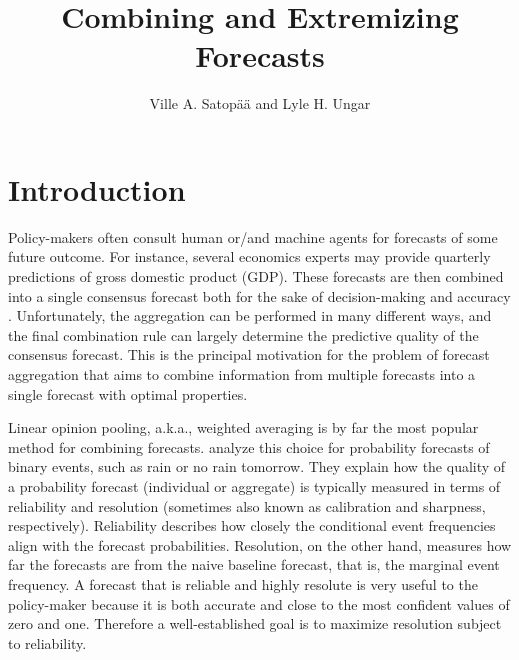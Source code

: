 \documentclass[11pt]{article}
\title{Combining and Extremizing Forecasts}
\author{
Ville A. Satop\"a\"a and Lyle H. Ungar}
\date{}
\theoremstyle{definition}
\theoremstyle{definition}
\begin{document}
\maketitle



\section{Introduction} \label{introduction}
Policy-makers often consult human or/and machine agents for forecasts of some future outcome. For instance, several economics experts may provide quarterly predictions of gross domestic product (GDP). These forecasts are then combined into a single consensus forecast both for the sake of decision-making and accuracy \citep{armstrong2}. Unfortunately, the aggregation can be performed  in many different ways, and the final combination rule can largely determine the predictive quality of the consensus forecast. This is the principal motivation for the problem of forecast aggregation that aims to combine information from multiple forecasts into a single forecast with optimal properties.

Linear opinion pooling, a.k.a., weighted averaging is by far the most popular method for combining forecasts. \cite{Ranjan08} analyze this choice for probability forecasts of binary events, such as rain or no rain tomorrow. They explain how the quality of a probability forecast (individual or aggregate) is typically measured in terms of reliability and resolution (sometimes also known as calibration and sharpness, respectively). Reliability describes how closely the conditional event frequencies align with the forecast probabilities. Resolution, on the other hand, measures how far the forecasts are from the naive baseline forecast, that is, the marginal event frequency. A forecast that is reliable and highly resolute is very useful to the policy-maker because it is both accurate and close to the most confident values of zero and one. Therefore a well-established goal is to maximize resolution subject to reliability. 

%
%
%
%
\end{document}
